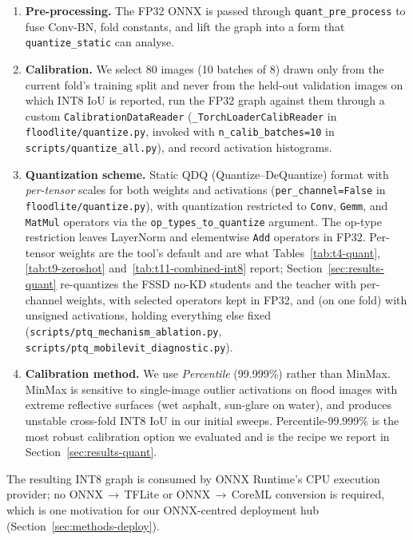 \begin{enumerate}
\item \textbf{Pre-processing.} The FP32 ONNX is passed through \texttt{quant\_pre\_process} to fuse Conv-BN, fold constants, and lift the graph into a form that \texttt{quantize\_static} can analyse.
\item \textbf{Calibration.} We select 80 images (10 batches of 8) drawn only from the current fold's training split and never from the held-out validation images on which INT8 IoU is reported, run the FP32 graph against them through a custom \texttt{CalibrationDataReader} (\texttt{\_TorchLoaderCalibReader} in \texttt{floodlite/quantize.py}, invoked with \texttt{n\_calib\_batches=10} in \texttt{scripts/quantize\_all.py}), and record activation histograms.
\item \textbf{Quantization scheme.} Static QDQ (Quantize--DeQuantize) format with \emph{per-tensor} scales for both weights and activations (\texttt{per\_channel=False} in \texttt{floodlite/quantize.py}), with quantization restricted to \texttt{Conv}, \texttt{Gemm}, and \texttt{MatMul} operators via the \texttt{op\_types\_to\_quantize} argument. The op-type restriction leaves LayerNorm and elementwise \texttt{Add} operators in FP32. Per-tensor weights are the tool's default and are what Tables~\ref{tab:t4-quant}, \ref{tab:t9-zeroshot} and~\ref{tab:t11-combined-int8} report; Section~\ref{sec:results-quant} re-quantizes the FSSD no-KD students and the teacher with per-channel weights, with selected operators kept in FP32, and (on one fold) with unsigned activations, holding everything else fixed (\texttt{scripts/ptq\_mechanism\_ablation.py}, \texttt{scripts/ptq\_mobilevit\_diagnostic.py}).
\item \textbf{Calibration method.} We use \emph{Percentile} (99.999\%) rather than MinMax. MinMax is sensitive to single-image outlier activations on flood images with extreme reflective surfaces (wet asphalt, sun-glare on water), and produces unstable cross-fold INT8 IoU in our initial sweeps. Percentile-99.999\% is the most robust calibration option we evaluated and is the recipe we report in Section~\ref{sec:results-quant}.
\end{enumerate}

The resulting INT8 graph is consumed by ONNX Runtime's CPU execution provider; no ONNX\,$\rightarrow$\,TFLite or ONNX\,$\rightarrow$\,CoreML conversion is required, which is one motivation for our ONNX-centred deployment hub (Section~\ref{sec:methods-deploy}).

